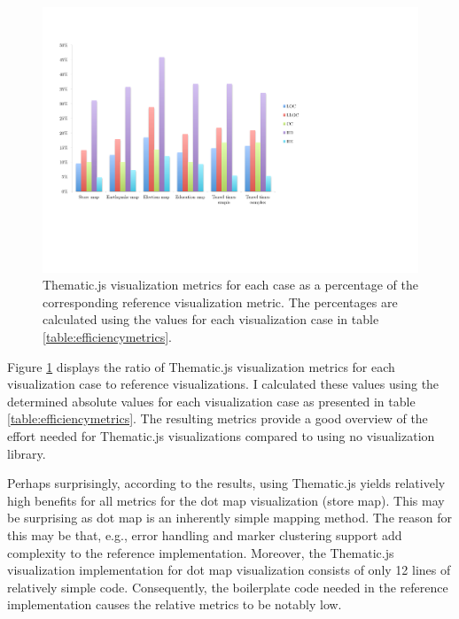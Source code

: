 \begin{figure}[htbp]
  \begin{center}
    \includegraphics[width=\textwidth]{images/evaluation-results.pdf}
    \caption{Thematic.js visualization metrics for each case as a percentage of the corresponding reference visualization metric. The percentages are calculated using the values for each visualization case in table \ref{table:efficiencymetrics}.}
    \label{fig:evaluationchart}
  \end{center}
\end{figure}

Figure \ref{fig:evaluationchart} displays the ratio of Thematic.js visualization metrics for each visualization case to reference visualizations. I calculated these values using the determined absolute values for each visualization case as presented in table \ref{table:efficiencymetrics}. The resulting metrics provide a good overview of the effort needed for Thematic.js visualizations compared to using no visualization library.

Perhaps surprisingly, according to the results, using Thematic.js yields relatively high benefits for all metrics for the dot map visualization (store map). This may be surprising as dot map is an inherently simple mapping method. The reason for this may be that, e.g., error handling and marker clustering support add complexity to the reference implementation. Moreover, the Thematic.js visualization implementation for dot map visualization consists of only 12 lines of relatively simple code. Consequently, the boilerplate code needed in the reference implementation causes the relative metrics to be notably low.

